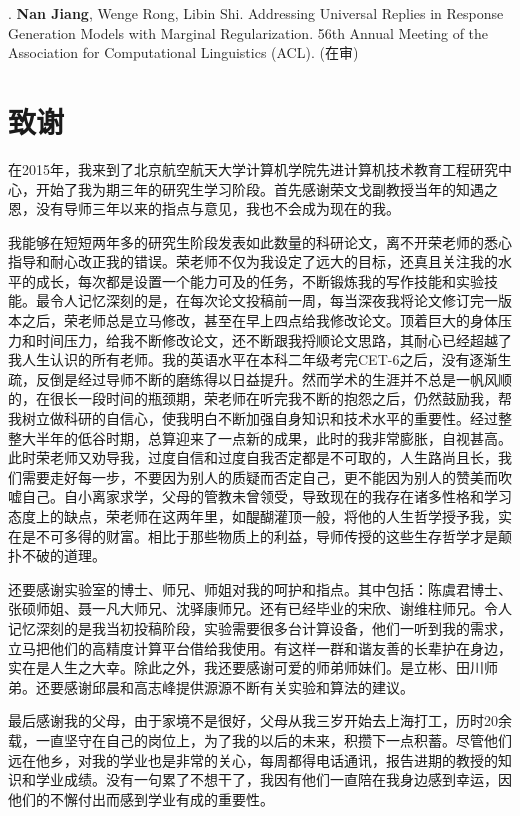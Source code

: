 . \textbf{Nan Jiang}, Wenge Rong, Libin Shi. Addressing Universal Replies in Response Generation Models with Marginal Regularization. 56th Annual Meeting of the Association for Computational Linguistics (ACL). (在审)

\chapter{致\quad 谢}
在2015年，我来到了北京航空航天大学计算机学院先进计算机技术教育工程研究中心，开始了我为期三年的研究生学习阶段。首先感谢荣文戈副教授当年的知遇之恩，没有导师三年以来的指点与意见，我也不会成为现在的我。

我能够在短短两年多的研究生阶段发表如此数量的科研论文，离不开荣老师的悉心指导和耐心改正我的错误。荣老师不仅为我设定了远大的目标，还真且关注我的水平的成长，每次都是设置一个能力可及的任务，不断锻炼我的写作技能和实验技能。最令人记忆深刻的是，在每次论文投稿前一周，每当深夜我将论文修订完一版本之后，荣老师总是立马修改，甚至在早上四点给我修改论文。顶着巨大的身体压力和时间压力，给我不断修改论文，还不断跟我捋顺论文思路，其耐心已经超越了我人生认识的所有老师。我的英语水平在本科二年级考完CET-6之后，没有逐渐生疏，反倒是经过导师不断的磨练得以日益提升。然而学术的生涯并不总是一帆风顺的，在很长一段时间的瓶颈期，荣老师在听完我不断的抱怨之后，仍然鼓励我，帮我树立做科研的自信心，使我明白不断加强自身知识和技术水平的重要性。经过整整大半年的低谷时期，总算迎来了一点新的成果，此时的我非常膨胀，自视甚高。此时荣老师又劝导我，过度自信和过度自我否定都是不可取的，人生路尚且长，我们需要走好每一步，不要因为别人的质疑而否定自己，更不能因为别人的赞美而吹嘘自己。自小离家求学，父母的管教未曾领受，导致现在的我存在诸多性格和学习态度上的缺点，荣老师在这两年里，如醍醐灌顶一般，将他的人生哲学授予我，实在是不可多得的财富。相比于那些物质上的利益，导师传授的这些生存哲学才是颠扑不破的道理。

还要感谢实验室的博士、师兄、师姐对我的呵护和指点。其中包括：陈虞君博士、张硕师姐、聂一凡大师兄、沈驿康师兄。还有已经毕业的宋欣、谢维柱师兄。令人记忆深刻的是我当初投稿阶段，实验需要很多台计算设备，他们一听到我的需求，立马把他们的高精度计算平台借给我使用。有这样一群和谐友善的长辈护在身边，实在是人生之大幸。除此之外，我还要感谢可爱的师弟师妹们。是立彬、田川师弟。还要感谢邱晨和高志峰提供源源不断有关实验和算法的建议。

最后感谢我的父母，由于家境不是很好，父母从我三岁开始去上海打工，历时20余载，一直坚守在自己的岗位上，为了我的以后的未来，积攒下一点积蓄。尽管他们远在他乡，对我的学业也是非常的关心，每周都得电话通讯，报告进期的教授的知识和学业成绩。没有一句累了不想干了，我因有他们一直陪在我身边感到幸运，因他们的不懈付出而感到学业有成的重要性。